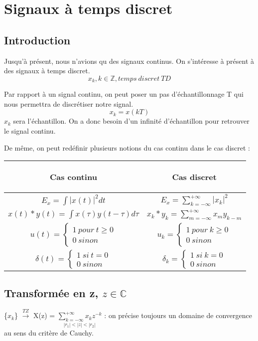 \section{Signaux à temps discret}
\subsection*{Introduction}
Jusqu'à présent, nous n'avions qu des signaux continus. On s'intéresse à présent à des signaux à temps discret.
\[x_k, k\in\mathbb{Z}, temps\ discret\ TD\]

Par rapport à un signal continu, on peut poser un pas d'échantillonnage T qui nous permettra de discrétiser notre signal.
\[x_k=x(kT)\]
$x_k$ sera l'échantillon. On a donc besoin d'un infinité d'échantillon pour retrouver le signal continu.

De même, on peut redéfinir plusieurs notions du cas continu dans le cas discret : \\
\begin{tabular}{|c|c|}
\hline
\begin{bf}Cas continu\end{bf} & \begin{bf}Cas discret \end{bf} \\
\hline
$E_x = \int |x(t)|^2 dt$ & $E_x = \sum_{k=-\infty}^{+\infty} |x_k|^2$ \\
\hline
$x(t)*y(t)=\int x(\tau)y(t-\tau)d\tau$ & $x_k*y_k=\sum_{m=-\infty}^{+\infty} x_m y_{k-m}$ \\
\hline
$u(t)=\left\{ \begin{array}{l} 1\ pour\ t \geq 0\\ 0\ sinon \end{array} \right.$ & $u_k=\left\{ \begin{array}{l} 1\ pour\ k \geq 0\\ 0\ sinon \end{array} \right.$\\
\hline
$\delta(t) = \left\{ \begin{array}{l} 1\ si\ t = 0\\ 0\ sinon \end{array} \right.$ & $\delta_k = \left\{ \begin{array}{l} 1\ si\ k= 0\\ 0\ sinon \end{array} \right.$ \\
\hline
\end{tabular}

\subsection{Transformée en z, $z \in \mathbb{C}$}
\{$x_k$\} $\xrightarrow{TZ}$ X(z) = $\underset{|r_1|<|z|<|r_2|}{\sum_{k=-\infty}^{+\infty} x_k z^{-k}}$ : on précise toujours un domaine de convergence au sens du critère de Cauchy.

